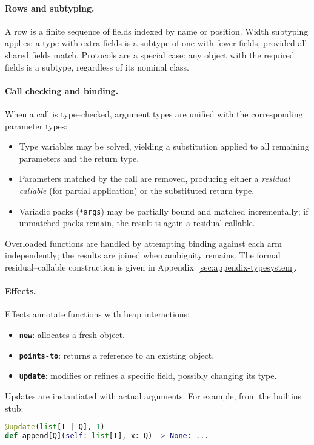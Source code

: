 \paragraph{Rows and subtyping.}
A row is a finite sequence of fields indexed by name or position.  
Width subtyping applies: a type with extra fields is a subtype of one with fewer fields, provided all shared fields match.  
Protocols are a special case: any object with the required fields is a subtype, regardless of its nominal class.

\paragraph{Call checking and binding.}
When a call is type--checked, argument types are unified with the corresponding parameter types:
\begin{itemize}
  \item Type variables may be solved, yielding a substitution applied to all remaining parameters and the return type.
  \item Parameters matched by the call are removed, producing either a \emph{residual callable} (for partial application) or the substituted return type.
  \item Variadic packs (\texttt{*args}) may be partially bound and matched incrementally; if unmatched packs remain, the result is again a residual callable.
\end{itemize}
Overloaded functions are handled by attempting binding against each arm independently; the results are joined when ambiguity remains.  
The formal residual--callable construction is given in Appendix~\ref{sec:appendix-typesystem}.

\paragraph{Effects.}
Effects annotate functions with heap interactions:
\begin{itemize}
  \item \textbf{\texttt{new}}: allocates a fresh object.
  \item \textbf{\texttt{points-to}}: returns a reference to an existing object.
  \item \textbf{\texttt{update}}: modifies or refines a specific field, possibly changing its type.
\end{itemize}
Updates are instantiated with actual arguments. For example, from the builtins stub:

\begin{lstlisting}[language=python]
@update(list[T | Q], 1)
def append[Q](self: list[T], x: Q) -> None: ...
\end{lstlisting}

